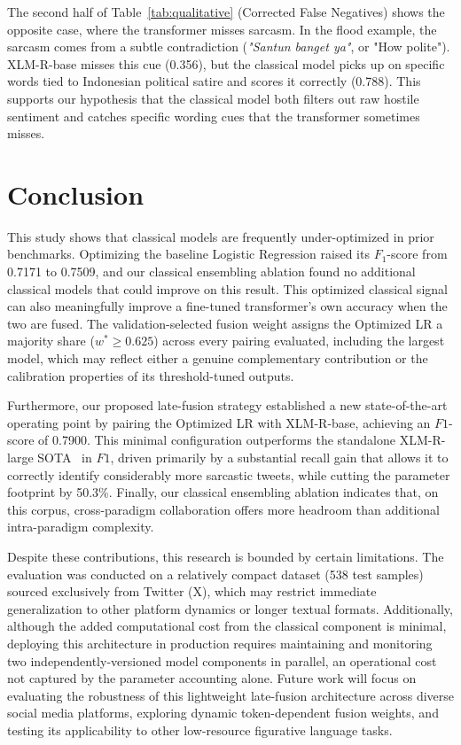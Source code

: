 \documentclass[conference]{IEEEtran}
\begin{document}
The second half of Table~\ref{tab:qualitative} (Corrected False Negatives) shows the opposite case, where the transformer misses sarcasm. In the flood example, the sarcasm comes from a subtle contradiction (\textit{"Santun banget ya"}, or "How polite"). XLM-R-base misses this cue (0.356), but the classical model picks up on specific words tied to Indonesian political satire and scores it correctly (0.788). This supports our hypothesis that the classical model both filters out raw hostile sentiment and catches specific wording cues that the transformer sometimes misses.

\section{Conclusion}
This study shows that classical models are frequently under-optimized in prior benchmarks. Optimizing the baseline Logistic Regression raised its $F_1$-score from 0.7171 to 0.7509, and our classical ensembling ablation found no additional classical models that could improve on this result. This optimized classical signal can also meaningfully improve a fine-tuned transformer's own accuracy when the two are fused. The validation-selected fusion weight assigns the Optimized LR a majority share ($w^* \geq 0.625$) across every pairing evaluated, including the largest model, which may reflect either a genuine complementary contribution or the calibration properties of its threshold-tuned outputs.

Furthermore, our proposed late-fusion strategy established a new state-of-the-art operating point by pairing the Optimized LR with XLM-R-base, achieving an $F1$-score of 0.7900. This minimal configuration outperforms the standalone XLM-R-large SOTA~\cite{idsarcasm} in $F1$, driven primarily by a substantial recall gain that allows it to correctly identify considerably more sarcastic tweets, while cutting the parameter footprint by 50.3\%. Finally, our classical ensembling ablation indicates that, on this corpus, cross-paradigm collaboration offers more headroom than additional intra-paradigm complexity.

Despite these contributions, this research is bounded by certain limitations. The evaluation was conducted on a relatively compact dataset (538 test samples) sourced exclusively from Twitter (X), which may restrict immediate generalization to other platform dynamics or longer textual formats. Additionally, although the added computational cost from the classical component is minimal, deploying this architecture in production requires maintaining and monitoring two independently-versioned model components in parallel, an operational cost not captured by the parameter accounting alone. Future work will focus on evaluating the robustness of this lightweight late-fusion architecture across diverse social media platforms, exploring dynamic token-dependent fusion weights, and testing its applicability to other low-resource figurative language tasks.



\end{document}
